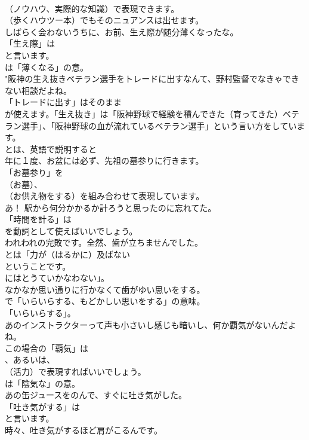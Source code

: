 \documentclass[8pt]{extreport}
\begin{document}
\begin{CJK}{UTF8}{min}
\\	（ノウハウ、実際的な知識）で表現できます。
\\	（歩くハウツー本）でもそのニュアンスは出せます。	
\\	しばらく会わないうちに、お前、生え際が随分薄くなったな。 
\\	「生え際」は
\\	と言います。
\\	は「薄くなる」の意。	
\\	"阪神の生え抜きベテラン選手をトレードに出すなんて、野村監督でなきゃできない相談だよね。 
\\	「トレードに出す」はそのまま
\\	が使えます。「生え抜き」は「阪神野球で経験を積んできた（育ってきた）ベテラン選手」、「阪神野球の血が流れているベテラン選手」という言い方をしています。
\\	とは、英語で説明すると
\\	年に１度、お盆には必ず、先祖の墓参りに行きます。 
\\	「お墓参り」を 
\\	（お墓）、
\\	（お供え物をする）を組み合わせて表現しています。	
\\	あ！ 駅から何分かかるか計ろうと思ったのに忘れてた。 
\\	「時間を計る」は
\\	を動詞として使えばいいでしょう。	
\\	われわれの完敗です。全然、歯が立ちませんでした。 
\\	とは「力が（はるかに）及ばない
\\	ということです。
\\	にはとうていかなわない」。	
\\	なかなか思い通りに行かなくて歯がゆい思いをする。 
\\	で「いらいらする、もどかしい思いをする」の意味。
\\	「いらいらする」。	
\\	あのインストラクターって声も小さいし感じも暗いし、何か覇気がないんだよね。 
\\	この場合の「覇気」は 
\\	、あるいは、
\\	（活力）で表現すればいいでしょう。
\\	は「陰気な」の意。	
\\	あの缶ジュースをのんで、すぐに吐き気がした。 
\\	「吐き気がする」は
\\	と言います。	
\\	時々、吐き気がするほど肩がこるんです。 

\end{CJK}
\end{document}
